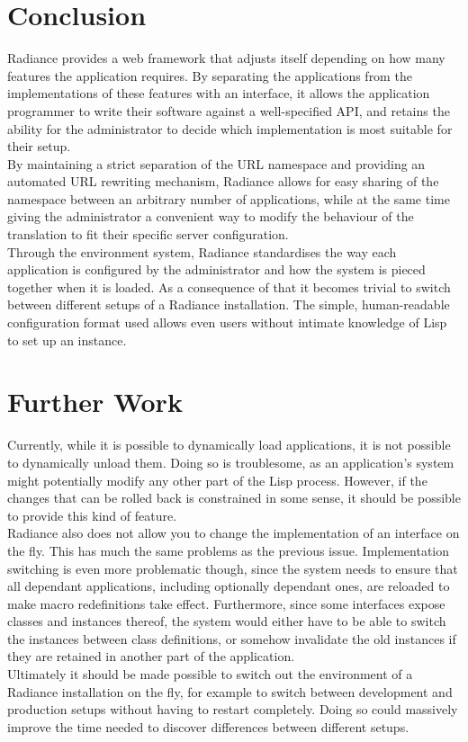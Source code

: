 \documentclass{sig-alternate}
\begin{document}
\section{Conclusion}
Radiance provides a web framework that adjusts itself depending on how many features the application requires. By separating the applications from the implementations of these features with an interface, it allows the application programmer to write their software against a well-specified API, and retains the ability for the administrator to decide which implementation is most suitable for their setup. \\

By maintaining a strict separation of the URL namespace and providing an automated URL rewriting mechanism, Radiance allows for easy sharing of the namespace between an arbitrary number of applications, while at the same time giving the administrator a convenient way to modify the behaviour of the translation to fit their specific server configuration. \\

Through the environment system, Radiance standardises the way each application is configured by the administrator and how the system is pieced together when it is loaded. As a consequence of that it becomes trivial to switch between different setups of a Radiance installation. The simple, human-readable configuration format used allows even users without intimate knowledge of Lisp to set up an instance.

\section{Further Work}
Currently, while it is possible to dynamically load applications, it is not possible to dynamically unload them. Doing so is troublesome, as an application's system might potentially modify any other part of the Lisp process. However, if the changes that can be rolled back is constrained in some sense, it should be possible to provide this kind of feature. \\

Radiance also does not allow you to change the implementation of an interface on the fly. This has much the same problems as the previous issue. Implementation switching is even more problematic though, since the system needs to ensure that all dependant applications, including optionally dependant ones, are reloaded to make macro redefinitions take effect. Furthermore, since some interfaces expose classes and instances thereof, the system would either have to be able to switch the instances between class definitions, or somehow invalidate the old instances if they are retained in another part of the application. \\

Ultimately it should be made possible to switch out the environment of a Radiance installation on the fly, for example to switch between development and production setups without having to restart completely. Doing so could massively improve the time needed to discover differences between different setups.


\end{document}
